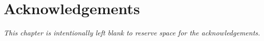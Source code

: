 \chapter*{Acknowledgements}

\emph{This chapter is intentionally left blank to reserve space for the acknowledgements.}
